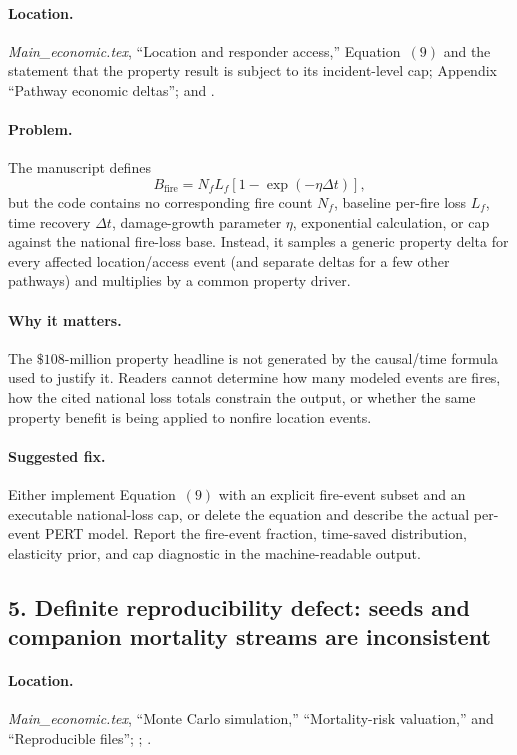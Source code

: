 \documentclass[11pt]{article}
\begin{document}
\paragraph{Location.}
\emph{Main\_economic.tex}, ``Location and responder access,'' Equation~\((9)\)
and the statement that the property result is subject to its incident-level
cap; Appendix ``Pathway economic deltas''; and
.

\paragraph{Problem.}
The manuscript defines
\[
B_{\mathrm{fire}}=N_fL_f\left[1-\exp(-\eta\Delta t)\right],
\]
but the code contains no corresponding fire count \(N_f\), baseline per-fire
loss \(L_f\), time recovery \(\Delta t\), damage-growth parameter \(\eta\),
exponential calculation, or cap against the national fire-loss base.  Instead,
it samples a generic property delta for every affected location/access event
(and separate deltas for a few other pathways) and multiplies by a common
property driver.

\paragraph{Why it matters.}
The \(\$108\)-million property headline is not generated by the causal/time
formula used to justify it.  Readers cannot determine how many modeled events
are fires, how the cited national loss totals constrain the output, or whether
the same property benefit is being applied to nonfire location events.

\paragraph{Suggested fix.}
Either implement Equation~\((9)\) with an explicit fire-event subset and an
executable national-loss cap, or delete the equation and describe the actual
per-event PERT model.  Report the fire-event fraction, time-saved distribution,
elasticity prior, and cap diagnostic in the machine-readable output.

\subsection*{5. Definite reproducibility defect: seeds and companion mortality streams are inconsistent}

\paragraph{Location.}
\emph{Main\_economic.tex}, ``Monte Carlo simulation,'' ``Mortality-risk
valuation,'' and ``Reproducible files''; ;
.
\end{document}
